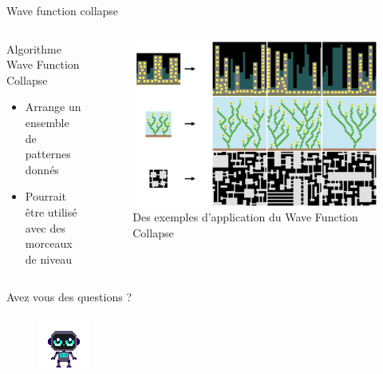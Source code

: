 \documentclass{beamer}
\begin{document}
{\begin{frame}{Wave function collapse}
    \begin{columns}
        \begin{block}{Algorithme Wave Function Collapse}
            \begin{itemize}
                \item[\bullet] Arrange un ensemble de patternes donnés
                \item[\bullet] Pourrait être utilisé avec des morceaux de niveau
            \end{itemize}
        \end{block}
        \begin{figure}
            \centering
            \includegraphics[width=1.0\textwidth]{wfc-examples}
            \caption{Des exemples d'application du Wave Function Collapse}
        \end{figure}
    \end{columns}
\end{frame}

}

\begin{frame}
    \centering
    Avez vous des questions ?
    \begin{figure}
        \centering
        \includegraphics[width=0.5\linewidth]{character_placeholder}
    \end{figure}
\end{frame}
\end{document}
